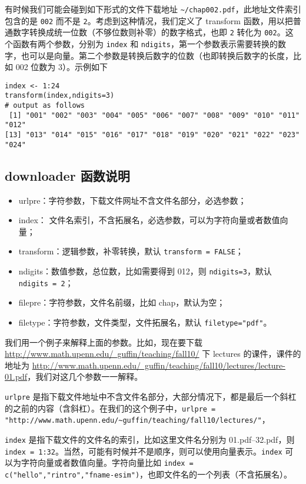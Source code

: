 \documentclass{article}
\begin{document}
有时候我们可能会碰到如下形式的文件下载地址 \lstinline{~/chap002.pdf}，此地址文件索引包含的是 \lstinline{002} 而不是 \lstinline{2}。考虑到这种情况，我们定义了 \textsf{transform} 函数，用以把普通数字转换成统一位数（不够位数则补零）的数字格式，也即 \lstinline{2} 转化为 \lstinline{002}。这个函数有两个参数，分别为 \lstinline{index} 和 \lstinline{ndigits}，第一个参数表示需要转换的数字，也可以是向量。第二个参数是转换后数字的位数（也即转换后数字的长度，比如 002 位数为 3）。示例如下
\begin{lstlisting}
index <- 1:24
transform(index,ndigits=3)
# output as follows
 [1] "001" "002" "003" "004" "005" "006" "007" "008" "009" "010" "011" "012"
[13] "013" "014" "015" "016" "017" "018" "019" "020" "021" "022" "023" "024"
\end{lstlisting}

\subsection{downloader 函数说明}
\begin{itemize}
    \item urlpre：字符参数，下载文件网址不含文件名部分，必选参数；
    \item index： 文件名索引，不含拓展名，必选参数，可以为字符向量或者数值向量；
    \item transform：逻辑参数，补零转换，默认 \lstinline{transform = FALSE}；
    \item ndigits：数值参数，总位数，比如需要得到 012，则 \lstinline{ndigits=3}，默认 \lstinline{ndigits = 2}；
    \item filepre：字符参数，文件名前缀，比如 chap，默认为空；
    \item filetype：字符参数，文件类型，文件拓展名，默认 \lstinline{filetype="pdf"}。
\end{itemize}

我们用一个例子来解释上面的参数。比如，现在要下载 \href{http://www.math.upenn.edu/~guffin/teaching/fall10/}{http://www.math.upenn.edu/~guffin/teaching/fall10/} 下 lectures 的课件，课件的地址为 \href{http://www.math.upenn.edu/~guffin/teaching/fall10/lectures/lecture-01.pdf}{http://www.math.upenn.edu/~guffin/teaching/fall10/lectures/lecture-01.pdf}，我们对这几个参数一一解释。

\lstinline{urlpre} 是指下载文件地址中不含文件名部分，大部分情况下，都是最后一个斜杠的之前的内容（含斜杠）。在我们的这个例子中，\lstinline{urlpre = "http://www.math.upenn.edu/~guffin/teaching/fall10/lectures/"}，

\lstinline{index} 是指下载文件的文件名的索引，比如这里文件名分别为 01.pdf--32.pdf，则 \lstinline{index = 1:32}。当然，可能有时候并不是顺序，则可以使用向量表示。\lstinline{index} 可以为字符向量或者数值向量。字符向量比如 \lstinline{index = c("hello","rintro","fname-esim")}，也即文件名的一个列表（不含拓展名）。
\end{document}
